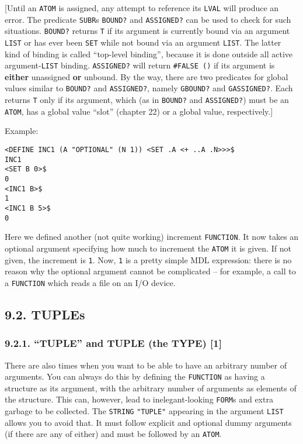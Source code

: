 \documentclass[a4paper,]{article}
\begin{document}
{[}Until an \texttt{ATOM} is assigned, any attempt to reference its \texttt{LVAL} will produce an error. The predicate
\texttt{SUBR}s \texttt{BOUND?} and \texttt{ASSIGNED?} can be
used to check for such situations. \texttt{BOUND?} returns \texttt{T} if its argument is currently bound via an argument
\texttt{LIST} or has ever been \texttt{SET} while not bound via an argument \texttt{LIST}. The latter kind of binding is
called ``top-level binding'', because it is done outside all active argument-\texttt{LIST} binding. \texttt{ASSIGNED?} will
return \texttt{\#FALSE\ ()} if its argument is \textbf{either} unassigned \textbf{or} unbound. By the way, there are two
predicates for global values similar to \texttt{BOUND?} and \texttt{ASSIGNED?}, namely
\texttt{GBOUND?} and \texttt{GASSIGNED?}. Each returns \texttt{T}
only if its argument, which (as in \texttt{BOUND?} and \texttt{ASSIGNED?}) must be an \texttt{ATOM}, has a global value
``slot'' (chapter 22) or a global value, respectively.{]}

Example:

\begin{verbatim}
<DEFINE INC1 (A "OPTIONAL" (N 1)) <SET .A <+ ..A .N>>>$
INC1
<SET B 0>$
0
<INC1 B>$
1
<INC1 B 5>$
0
\end{verbatim}

Here we defined another (not quite working) increment \texttt{FUNCTION}. It now takes an optional argument specifying how
much to increment the \texttt{ATOM} it is given. If not given, the increment is \texttt{1}. Now, \texttt{1} is a pretty
simple MDL expression: there is no reason why the optional argument cannot be complicated -- for example, a call to a
\texttt{FUNCTION} which reads a file on an I/O device.

\subsection{9.2. TUPLEs}\label{tuples}

\subsubsection{\texorpdfstring{9.2.1. ``TUPLE'' and TUPLE (the TYPE)
{[}1{]}}{9.2.1. TUPLE and TUPLE (the TYPE) {[}1{]}}}\label{tuple-and-tuple-the-type-1}

There are also times when you want to be able to have an arbitrary number of arguments. You can always do this by defining
the \texttt{FUNCTION} as having a structure as its argument, with the arbitrary number of arguments as elements of the
structure. This can, however, lead to inelegant-looking \texttt{FORM}s and extra garbage to be collected. The
\texttt{STRING} \texttt{"TUPLE"}  appearing in the argument \texttt{LIST} allows you to
avoid that. It must follow explicit and optional dummy arguments (if there are any of either) and must be followed by an
\texttt{ATOM}.
\end{document}
